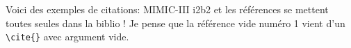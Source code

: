 \documentclass{amia}
\begin{document}
%
%


Voici des exemples de citations: MIMIC-III\cite{Johnson:SD2016} i2b2 \cite{Klann:JAMIA2016} et les références se mettent toutes seules dans la biblio ! Je pense que la référence vide numéro 1 vient d'un \verb+\cite{}+ avec argument vide.

\makeatletter
\renewcommand{\@biblabel}[1]{\hfill #1.}
\makeatother
\end{document}
